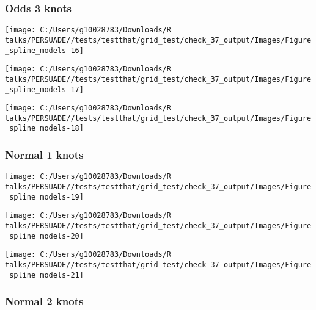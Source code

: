 \documentclass[
]{article}
\begin{document}
\clearpage

\subsubsection{Odds 3 knots}\label{odds-3-knots}

\begin{flushleft}\texttt{[image: C:/Users/g10028783/Downloads/R talks/PERSUADE//tests/testthat/grid\_test/check\_37\_output/Images/Figure\_spline\_models-16]} \end{flushleft}

\begin{flushleft}\texttt{[image: C:/Users/g10028783/Downloads/R talks/PERSUADE//tests/testthat/grid\_test/check\_37\_output/Images/Figure\_spline\_models-17]} \end{flushleft}

\begin{flushleft}\texttt{[image: C:/Users/g10028783/Downloads/R talks/PERSUADE//tests/testthat/grid\_test/check\_37\_output/Images/Figure\_spline\_models-18]} \end{flushleft}

\clearpage

\subsubsection{Normal 1 knots}\label{normal-1-knots}

\begin{flushleft}\texttt{[image: C:/Users/g10028783/Downloads/R talks/PERSUADE//tests/testthat/grid\_test/check\_37\_output/Images/Figure\_spline\_models-19]} \end{flushleft}

\begin{flushleft}\texttt{[image: C:/Users/g10028783/Downloads/R talks/PERSUADE//tests/testthat/grid\_test/check\_37\_output/Images/Figure\_spline\_models-20]} \end{flushleft}

\begin{flushleft}\texttt{[image: C:/Users/g10028783/Downloads/R talks/PERSUADE//tests/testthat/grid\_test/check\_37\_output/Images/Figure\_spline\_models-21]} \end{flushleft}

\clearpage

\subsubsection{Normal 2 knots}\label{normal-2-knots}
\end{document}
